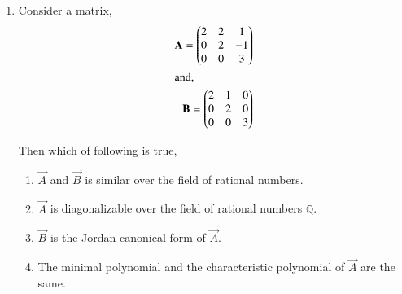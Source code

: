 \begin{enumerate}[label=\thesection.\arabic*.,ref=\thesection.\theenumi]
\solution

\item 	Consider a matrix,
	\begin{align}
	\mathbf{A} = \begin{pmatrix}2 & 2 & 1 \\0 & 2 & -1 \\ 0 & 0 & 3\end{pmatrix}\\ \intertext{and,} \mathbf{B} = \begin{pmatrix}2 & 1 & 0 \\ 0 & 2 & 0 \\ 0 & 0 & 3\end{pmatrix}
	\end{align}
	
Then which of following is true,
\begin{enumerate}
\item $\vec{A}$ and $\vec{B}$ is similar over the field of rational numbers.
\item $\vec{A}$ is diagonalizable over the field of rational numbers $\mathbb{Q}$.
\item $\vec{B}$ is the Jordan canonical form of $\vec{A}$.
\item The minimal polynomial and the characteristic polynomial of $\vec{A}$ are the same.
\end{enumerate}
%
\solution


\end{enumerate}
